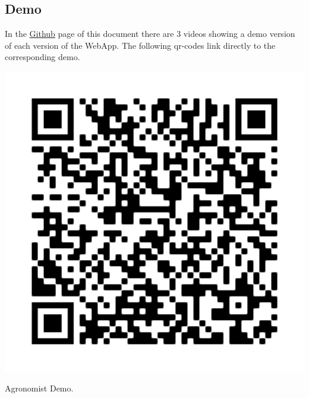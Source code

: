 \subsection{Demo}
In the \href{https://github.com/ViaforaMatteo/StaffolaniTaborelliViafora/tree/main/DeliveryFolder/Mockup}{Github} page of this document there are 3 videos showing a demo version of each version of the WebApp. The following qr-codes link directly to the corresponding demo.\\
\begin{minipage}{.33\textwidth}
	\centering
	\includegraphics[width=1\textwidth]{Images/QR code/AgronomistQR.png}
	\captionsetup{type=figure}
	\caption{Agronomist Demo.}
\end{minipage}%
